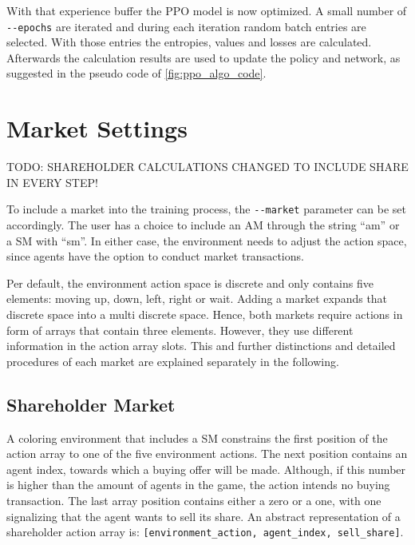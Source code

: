 With that experience buffer the PPO model is now optimized. A small number of \verb|--epochs| are iterated and during each iteration random batch entries are selected. With those entries the entropies, values and losses are calculated. Afterwards the calculation results are used to update the policy and network, as suggested in the pseudo code of \ref{fig:ppo_algo_code}.

\section{Market Settings}\label{market_settings}

TODO: SHAREHOLDER CALCULATIONS CHANGED TO INCLUDE SHARE IN EVERY STEP!


To include a market into the training process, the \verb|--market| parameter can be set accordingly. The user has a choice to include an AM through the string ``am'' or a SM with ``sm''. In either case, the environment needs to adjust the action space, since agents have the option to conduct market transactions.

Per default, the environment action space is discrete and only contains five elements: moving up, down, left, right or wait. Adding a market expands that discrete space into a multi discrete space. Hence, both markets require actions in form of arrays that contain three elements. However, they use different information in the action array slots. This and further distinctions and detailed procedures of each market are explained separately in the following.

\subsection{Shareholder Market}
A coloring environment that includes a SM constrains the first position of the action array to one of the five environment actions. The next position contains an agent index, towards which a buying offer will be made. Although, if this number is higher than the amount of agents in the game, the action intends no buying transaction. The last array position contains either a zero or a one, with one signalizing that the agent wants to sell its share. An abstract representation of a shareholder action array is: \verb|[environment_action, agent_index, sell_share]|.

